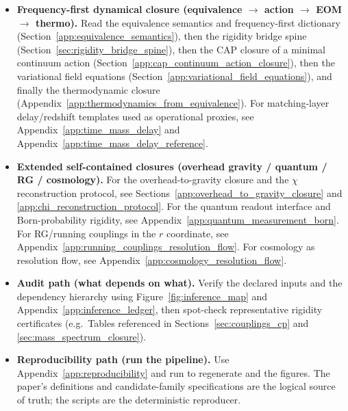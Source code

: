 \begin{itemize}
\item \textbf{Frequency-first dynamical closure (equivalence $\to$ action $\to$ EOM $\to$ thermo).}
Read the equivalence semantics and frequency-first dictionary (Section~\ref{app:equivalence_semantics}), then the rigidity bridge spine (Section~\ref{sec:rigidity_bridge_spine}), then the CAP closure of a minimal continuum action (Section~\ref{app:cap_continuum_action_closure}), then the variational field equations (Section~\ref{app:variational_field_equations}), and finally the thermodynamic closure (Appendix~\ref{app:thermodynamics_from_equivalence}).
For matching-layer delay/redshift templates used as operational proxies, see Appendix~\ref{app:time_mass_delay} and Appendix~\ref{app:time_mass_delay_reference}.
\item \textbf{Extended self-contained closures (overhead gravity / quantum / RG / cosmology).}
For the overhead-to-gravity closure and the $\chi$ reconstruction protocol, see Sections~\ref{app:overhead_to_gravity_closure} and \ref{app:chi_reconstruction_protocol}.
For the quantum readout interface and Born-probability rigidity, see Appendix~\ref{app:quantum_measurement_born}.
For RG/running couplings in the $r$ coordinate, see Appendix~\ref{app:running_couplings_resolution_flow}.
For cosmology as resolution flow, see Appendix~\ref{app:cosmology_resolution_flow}.
\item \textbf{Audit path (what depends on what).}
Verify the declared inputs and the dependency hierarchy using Figure~\ref{fig:inference_map} and Appendix~\ref{app:inference_ledger}, then spot-check representative rigidity certificates (e.g.\ Tables referenced in Sections~\ref{sec:couplings_cp} and \ref{sec:mass_spectrum_closure}).
\item \textbf{Reproducibility path (run the pipeline).}
Use Appendix~\ref{app:reproducibility} and run  to regenerate  and the figures.
The paper's definitions and candidate-family specifications are the logical source of truth; the scripts are the deterministic reproducer.
\end{itemize}


